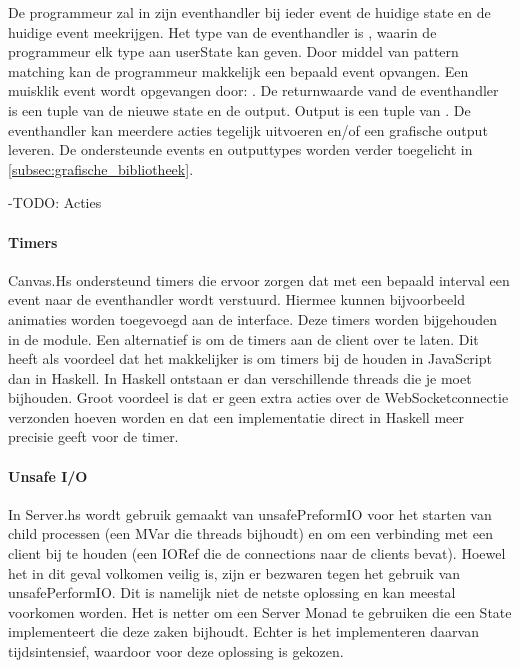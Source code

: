 De programmeur zal in zijn eventhandler bij ieder event de huidige state en de huidige event meekrijgen. Het type van de eventhandler is , waarin de programmeur elk type aan userState kan geven. Door middel van pattern matching kan de programmeur makkelijk een bepaald event opvangen. Een muisklik event wordt opgevangen door: . De returnwaarde vand de eventhandler is een tuple van de nieuwe state en de output. Output is een tuple van . De eventhandler kan meerdere acties tegelijk uitvoeren en/of een grafische output leveren. De ondersteunde events en outputtypes worden verder toegelicht in \autoref{subsec:grafische_bibliotheek}.

-TODO: Acties   
\paragraph{Timers}
Canvas.Hs ondersteund timers die ervoor zorgen dat met een bepaald interval een event naar de eventhandler wordt verstuurd. Hiermee kunnen bijvoorbeeld animaties worden toegevoegd aan de interface. Deze timers worden bijgehouden in de module. Een alternatief is om de timers aan de client over te laten. Dit heeft als voordeel dat het makkelijker is om timers bij de houden in JavaScript dan in Haskell. In Haskell ontstaan er dan verschillende threads die je moet bijhouden. Groot voordeel is dat er geen extra acties over de WebSocketconnectie verzonden hoeven worden en dat een implementatie direct in Haskell meer precisie geeft voor de timer.

\paragraph{Unsafe I/O}
In Server.hs wordt gebruik gemaakt van unsafePreformIO voor het starten van child processen (een MVar die threads bijhoudt) en om een verbinding met een client bij te houden (een IORef die de connections naar de clients bevat). Hoewel het in dit geval volkomen veilig is, zijn er bezwaren tegen het gebruik van unsafePerformIO\cite{Haskell.org2008}. Dit is namelijk niet de netste oplossing en kan meestal voorkomen worden. Het is netter om een Server Monad te gebruiken die een State implementeert die deze zaken bijhoudt. Echter is het implementeren daarvan tijdsintensief, waardoor voor deze oplossing is gekozen.